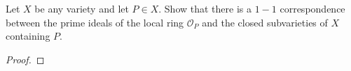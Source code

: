 \label{1.3.11}

Let $X$ be any variety and let $P \in X$. Show that there is a $1-1$ correspondence between the prime ideals of the local ring $\mathcal O_P$ and the closed subvarieties of $X$ containing $P$.

\begin{proof}

\end{proof}
